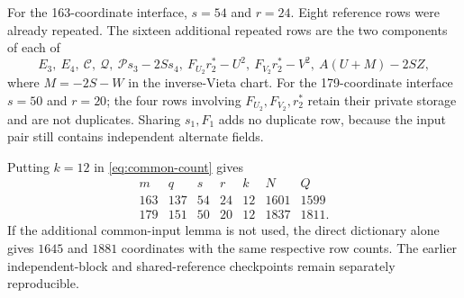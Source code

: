 \documentclass[11pt]{article}
\begin{document}
For the 163-coordinate interface, \(s=54\) and \(r=24\).  Eight
reference rows were already repeated.  The sixteen additional repeated
rows are the two components of each of
\[
 E_3,\ E_4,\ \mathcal C,\ \mathcal Q,\ \mathcal P s_3-2Ss_4,
 \ F_{U_2}r_2^*-U^2,\ F_{V_2}r_2^*-V^2,
 \ A(U+M)-2SZ,
\]
where \(M=-2S-W\) in the inverse-Vieta chart.
For the 179-coordinate interface \(s=50\) and \(r=20\); the four
rows involving \(F_{U_2},F_{V_2},r_2^*\) retain their private storage
and are not duplicates.  Sharing \(s_1,F_1\) adds no duplicate row,
because the input pair still contains independent alternate fields.

Putting \(k=12\) in \eqref{eq:common-count} gives
\[
\begin{array}{c|rrrr|rr}
 m&q&s&r&k&N&Q\\\hline
 163&137&54&24&12&1601&1599\\
 179&151&50&20&12&1837&1811.
\end{array}
\]
If the additional common-input lemma is not used, the direct dictionary
alone gives \(1645\) and \(1881\) coordinates with the same respective
row counts.  The earlier independent-block and shared-reference
checkpoints remain separately reproducible.
\end{document}
